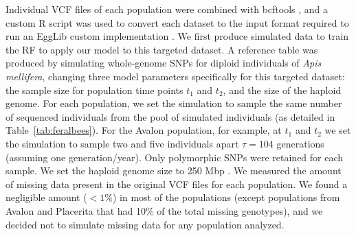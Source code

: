 \documentclass[a4paper, 12pt]{article}
\begin{document}
Individual VCF files of each population were combined with bcftools \citep{Li:2011kr}, and a custom R script was used to convert each dataset to the input format required to run an EggLib custom implementation \citep[in][]{Pavinato:2021}. We first produce simulated data to train the RF to apply our model to this targeted dataset. A reference table was produced by simulating whole-genome SNPs for diploid individuals of \textit{Apis mellifera}, changing three model parameters specifically for this targeted dataset: the sample size for population time points $t_1$ and $t_2$, and the size of the haploid genome. For each population, we set the simulation to sample the same number of sequenced individuals from the pool of simulated individuals (as detailed in Table~\ref{tab:feralbees}). For the Avalon population, for example, at $t_1$ and $t_2$ we set the simulation to sample two and five individuals apart $\tau = 104$ generations (assuming one generation/year). Only polymorphic SNPs were retained for each sample. We set the haploid genome size to 250 Mbp \citep[similar to the most recent estimates of \textit{A. mellifera} genome size;][]{Elsik:2014hf}. We measured the amount of missing data present in the original VCF files \citep{Cridland:2018fx} for each population. We found a negligible amount ($< 1\%$) in most of the populations (except populations from Avalon and Placerita that had 10\% of the total missing genotypes), and we decided not to simulate missing data for any population analyzed.
\end{document}
